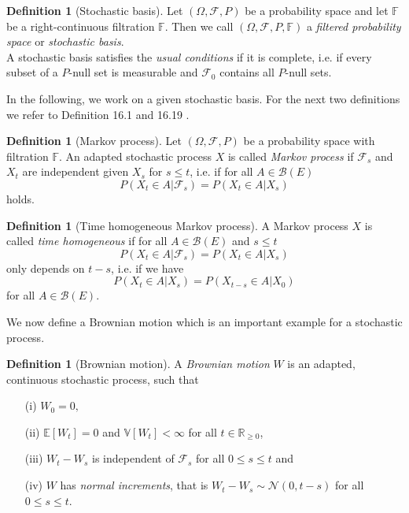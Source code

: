 \documentclass[11pt,titlepage]{article}
\newcommand{\R}{\mathbb{R}} %
\newcommand{\E}{\mathbb{E}} %
\newcommand{\V}{\mathbb{V}} %
\theoremstyle{definition}
\newtheorem{definition}[theorem]{Definition}
\theoremstyle{remark}
\begin{document}
	\begin{definition}[Stochastic basis]
		Let $(\Omega, \mathcal{F}, P)$ be a probability space and let $\mathbb{F}$ be a right-continuous filtration 
		$\mathbb{F}$. Then we call $(\Omega, \mathcal{F}, P, \mathbb{F})$ a \textsl{filtered probability space} or \textsl{stochastic basis}.\\
		A stochastic basis satisfies the \textsl{usual conditions} if it is complete, i.e. 
		if every subset of a $P$-null set is measurable and $\mathcal{F}_0$ contains all $P$-null sets.
	\end{definition}
	
	In the following, we work on a given stochastic basis. For the next two definitions we refer to Definition 16.1 and 16.19 \cite{Pfaffelhuber2020}.
	
	\begin{definition}[Markov process]
		Let $(\Omega, \mathcal{F}, P)$ be a probability space with filtration $\mathbb{F}$. An adapted stochastic process $X$ is called \textsl{Markov process} if 
		$\mathcal{F}_s$ and $X_t$ are independent given $X_s$ for $s\leq t$, i.e. if for all $A\in\mathcal{B}(E)$ 
		\[P(X_t\in A \vert \mathcal{F}_s)=P(X_t\in A\vert X_s)\]
		holds.
	\end{definition}
	
	\begin{definition}[Time homogeneous Markov process]\label{Def time homog}
		A Markov process $X$ is called \textsl{time homogeneous} if for all $A\in\mathcal{B}(E)$ 
		and $s \leq t$
		\[P(X_t\in A \vert \mathcal{F}_s)=P(X_t\in A\vert X_s)\]
		only depends on $t-s$, i.e. if we have
		\[P(X_t \in A\vert X_s) = P(X_{t-s}\in A\vert X_0)\]
		for all $A\in\mathcal{B}(E)$.
	\end{definition}
	
	We now define a Brownian motion which is an important example for a stochastic process. 
	
	\begin{definition}[Brownian motion]\label{Def brownian motion}
		A \textsl{Brownian motion} $W$ is an adapted, continuous stochastic process, such that
		\begin{itemize}
			\item[(i)] $W_0 = 0,$
			\item[(ii)] $\E[W_t]=0$ and $\V[W_t]<\infty$ for all $t\in\R_{\geq 0}$,
			\item[(iii)] $W_t - W_s$ is independent of $\mathcal{F}_s$ for all $0\leq s\leq t$ and
			\item[(iv)] $W$ has \textsl{normal increments}, that is $W_t-W_s\sim\mathcal{N}(0, t-s)$ for all $0\leq s\leq t$.
		\end{itemize}
	\end{definition}
\end{document}
